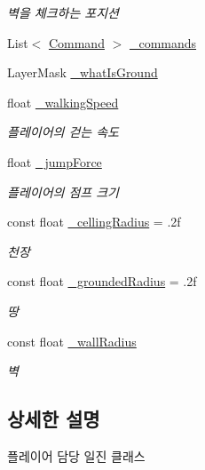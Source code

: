 \begin{DoxyCompactItemize}
\begin{DoxyCompactList}\small\item\em 벽을 체크하는 포지션 \end{DoxyCompactList}\item 
List$<$ \mbox{\hyperlink{class_command}{Command}} $>$ \mbox{\hyperlink{class_player_controller_aab899fbdea369867174253d2efd978fe}{\+\_\+commands}}
\item 
Layer\+Mask \mbox{\hyperlink{class_player_controller_a9e49eccbc78237a2355490b7df08368d}{\+\_\+what\+Is\+Ground}}
\item 
float \mbox{\hyperlink{class_player_controller_a1ab6a7892eecf1a9fa7b1a49842a3dd2}{\+\_\+walking\+Speed}}
\begin{DoxyCompactList}\small\item\em 플레이어의 걷는 속도 \end{DoxyCompactList}\item 
float \mbox{\hyperlink{class_player_controller_aaec5e4333fe1c532900ca666c075261c}{\+\_\+jump\+Force}}
\begin{DoxyCompactList}\small\item\em 플레이어의 점프 크기 \end{DoxyCompactList}\item 
const float \mbox{\hyperlink{class_player_controller_a306070e77c6bcd09f4fed177c876684f}{\+\_\+celling\+Radius}} = .\+2f
\begin{DoxyCompactList}\small\item\em 천장 \end{DoxyCompactList}\item 
const float \mbox{\hyperlink{class_player_controller_a81d04f96edabfd06d6ba1ecb26322f6a}{\+\_\+grounded\+Radius}} = .\+2f
\begin{DoxyCompactList}\small\item\em 땅 \end{DoxyCompactList}\item 
const float \mbox{\hyperlink{class_player_controller_a74197aa3c628821b417fb62afec5aecc}{\+\_\+wall\+Radius}}
\begin{DoxyCompactList}\small\item\em 벽 \end{DoxyCompactList}\end{DoxyCompactItemize}


\subsection{상세한 설명}
플레이어 담당 일진 클래스 

